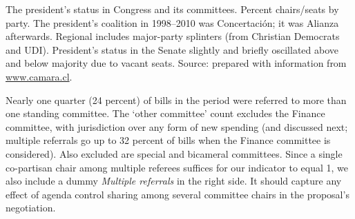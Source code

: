 \documentclass[letter,12pt]{article}
\newcommand{\mc}{\multicolumn}
\begin{document}
\begin{table}
\begin{center}
\caption{The president's status in Congress and its committees. Percent chairs/seats by party. The president's coalition in 1998--2010 was Concertación; it was Alianza afterwards. Regional includes major-party splinters (from Christian Democrats and UDI). President's status in the Senate slightly and briefly oscillated above and below majority due to vacant seats. Source: prepared with information from \protect\url{www.camara.cl}.}\label{T:chairsSeats}
\end{center}
\end{table}

Nearly one quarter (24 percent) of bills in the period were referred to more than one standing committee. The `other committee' count excludes the Finance committee, with jurisdiction over any form of new spending (and discussed next; multiple referrals go up to 32 percent of bills when the Finance committee is considered). Also excluded are special and bicameral committees. Since a single co-partisan chair among multiple referees suffices for our indicator to equal 1, we also include a dummy \emph{Multiple referrals} in the right side. It should capture any effect of agenda control sharing among several committee chairs in the proposal's negotiation. 
\end{document}
